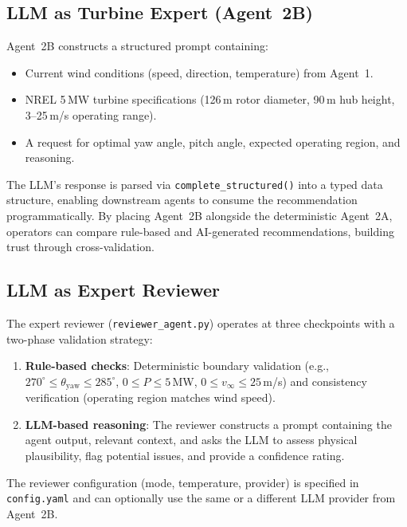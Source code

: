 \documentclass[12pt]{article}
\begin{document}
\subsection{LLM as Turbine Expert (Agent~2B)}
\label{sec:llm_expert}

Agent~2B constructs a structured prompt containing:
\begin{itemize}[leftmargin=*]
    \item Current wind conditions (speed, direction, temperature) from Agent~1.
    \item NREL 5\,MW turbine specifications (126\,m rotor diameter, 90\,m hub height, 3--25\,m/s operating range).
    \item A request for optimal yaw angle, pitch angle, expected operating region, and reasoning.
\end{itemize}
The LLM's response is parsed via \texttt{complete\_structured()} into a typed data structure, enabling downstream agents to consume the recommendation programmatically.
By placing Agent~2B alongside the deterministic Agent~2A, operators can compare rule-based and AI-generated recommendations, building trust through cross-validation.

\subsection{LLM as Expert Reviewer}
\label{sec:llm_reviewer}

The expert reviewer (\texttt{reviewer\_agent.py}) operates at three checkpoints with a two-phase validation strategy:
\begin{enumerate}[leftmargin=*]
    \item \textbf{Rule-based checks}: Deterministic boundary validation (e.g., $270^\circ \leq \theta_{\text{yaw}} \leq 285^\circ$, $0 \leq P \leq 5$\,MW, $0 \leq v_\infty \leq 25$\,m/s) and consistency verification (operating region matches wind speed).
    \item \textbf{LLM-based reasoning}: The reviewer constructs a prompt containing the agent output, relevant context, and asks the LLM to assess physical plausibility, flag potential issues, and provide a confidence rating.
\end{enumerate}
The reviewer configuration (mode, temperature, provider) is specified in \texttt{config.yaml} and can optionally use the same or a different LLM provider from Agent~2B.


\end{document}
